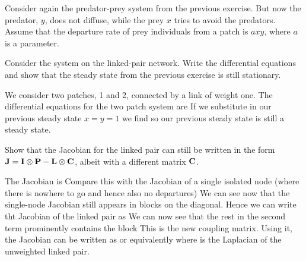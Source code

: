 Consider again the predator-prey system from the previous exercise. But now the predator, $y$, does not diffuse, while the prey $x$ tries to avoid the predators. Assume that the departure rate of prey individuals from a patch is $axy$, where $a$ is a parameter. 

\subquestion Consider the system on the linked-pair network. Write the differential equations and show that the steady state from the previous exercise is still stationary.

\solution 
We consider two patches, 1 and 2, connected by a link of weight one. The differential equations for the two patch system are 
If we substitute in our previous steady state $x=y=1$ we find 
so our previous steady state is still a steady state. 

\subquestion 
Show that the Jacobian for the linked pair can still be written in the form ${\bf J}={\bf I}\otimes{\bf P}-{\bf L}\otimes {\bf C}$, albeit with a different matrix $\bf C$. 

\solution
The Jacobian is 
Compare this with the Jacobian of a single isolated node (where there is nowhere to go and hence also no departures) 
We can see now that the single-node Jacobian still appears in blocks on the diagonal. Hence we can write tht Jacobian of the linked pair as 
We can now see that the rest in the second term prominently contains the block 
This is the new coupling matrix. Using it, the Jacobian can be written as 
or equivalently 
where 
is the Laplacian of the unweighted linked pair. 

